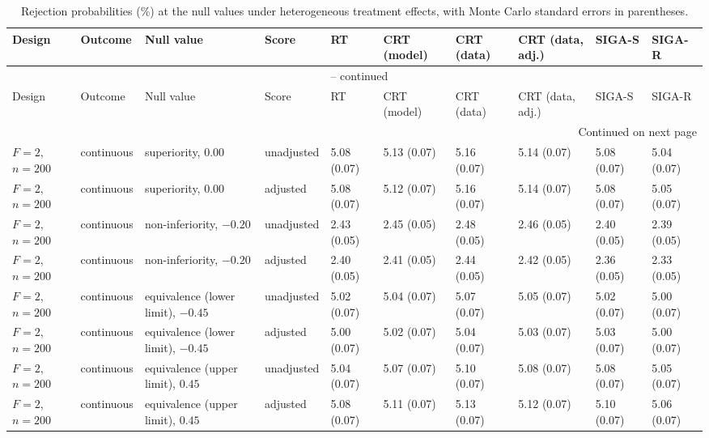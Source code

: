 \clearpage
\begin{landscape}\begin{singlespace}\begingroup\footnotesize\setlength{\tabcolsep}{2pt}\renewcommand{\arraystretch}{1.05}\setlength{\LTleft}{\fill}\setlength{\LTright}{\fill}
\begin{longtable}{@{}llllllllll@{}}
\caption{Rejection probabilities (\%) at the null values under heterogeneous treatment effects, with Monte Carlo standard errors in parentheses.}
\label{tab:supp-hetero-null}\\
\toprule
Design & Outcome & Null value & Score & RT & CRT (model) & CRT (data) & CRT (data, adj.) & SIGA-S & SIGA-R\\
\midrule\endfirsthead
\multicolumn{10}{c}{\tablename\ \thetable{} -- continued}\\\toprule
Design & Outcome & Null value & Score & RT & CRT (model) & CRT (data) & CRT (data, adj.) & SIGA-S & SIGA-R\\
\midrule\endhead
\midrule\multicolumn{10}{r}{Continued on next page}\\\endfoot
\bottomrule\endlastfoot
$F=2$, $n=200$ & continuous & superiority, $0.00$ & unadjusted & 5.08 (0.07) & 5.13 (0.07) & 5.16 (0.07) & 5.14 (0.07) & 5.08 (0.07) & 5.04 (0.07)\\
$F=2$, $n=200$ & continuous & superiority, $0.00$ & adjusted & 5.08 (0.07) & 5.12 (0.07) & 5.16 (0.07) & 5.14 (0.07) & 5.08 (0.07) & 5.05 (0.07)\\
$F=2$, $n=200$ & continuous & non-inferiority, $-0.20$ & unadjusted & 2.43 (0.05) & 2.45 (0.05) & 2.48 (0.05) & 2.46 (0.05) & 2.40 (0.05) & 2.39 (0.05)\\
$F=2$, $n=200$ & continuous & non-inferiority, $-0.20$ & adjusted & 2.40 (0.05) & 2.41 (0.05) & 2.44 (0.05) & 2.42 (0.05) & 2.36 (0.05) & 2.33 (0.05)\\
$F=2$, $n=200$ & continuous & equivalence (lower limit), $-0.45$ & unadjusted & 5.02 (0.07) & 5.04 (0.07) & 5.07 (0.07) & 5.05 (0.07) & 5.02 (0.07) & 5.00 (0.07)\\
$F=2$, $n=200$ & continuous & equivalence (lower limit), $-0.45$ & adjusted & 5.00 (0.07) & 5.02 (0.07) & 5.04 (0.07) & 5.03 (0.07) & 5.03 (0.07) & 5.00 (0.07)\\
$F=2$, $n=200$ & continuous & equivalence (upper limit), $0.45$ & unadjusted & 5.04 (0.07) & 5.07 (0.07) & 5.10 (0.07) & 5.08 (0.07) & 5.08 (0.07) & 5.05 (0.07)\\
$F=2$, $n=200$ & continuous & equivalence (upper limit), $0.45$ & adjusted & 5.08 (0.07) & 5.11 (0.07) & 5.13 (0.07) & 5.12 (0.07) & 5.10 (0.07) & 5.06 (0.07)\\

\end{longtable}
\end{singlespace}
\end{landscape}

